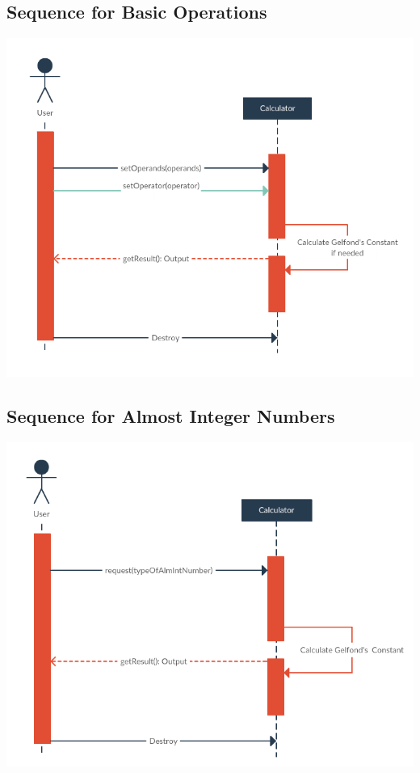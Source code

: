 \documentclass{article}
\begin{document}
\subsection{Sequence for Basic Operations}
\begin{center}
    \includegraphics[scale=0.38]{images/n4-sequence-0.png}    
\end{center}

\subsection{Sequence for Almost Integer Numbers}
\begin{center}
    \includegraphics[scale=0.4]{images/n4-sequence-1.png}
\end{center}
\end{document}

